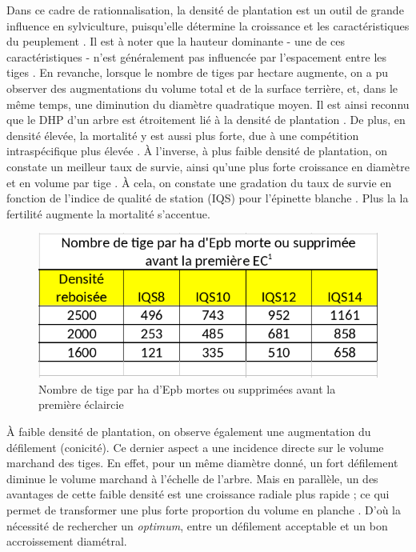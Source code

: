 \documentclass[letterpaper, 12pt]{article}
\begin{document}
\begin{onehalfspace}
Dans ce cadre de rationnalisation, la densité de plantation est un outil de grande influence en sylviculture, puisqu'elle détermine la croissance et les caractéristiques du peuplement \cite{Thiffault2003}. Il est à noter que la hauteur dominante - une de ces caractéristiques - n'est généralement pas influencée par l'espacement entre les tiges \cite{Gizachew2012}. En revanche, lorsque le nombre de tiges par hectare augmente, on a pu observer des augmentations du volume total et de la surface terrière, et, dans le même temps, une diminution du diamètre quadratique moyen. Il est ainsi reconnu que le DHP d'un arbre est étroitement lié à la densité de plantation \cite{Pregent1998}. De plus, en densité élevée, la mortalité y est aussi plus forte, due à une compétition intraspécifique plus élevée \cite{Groot2016, Will2010}. À l'inverse, à plus faible densité de plantation, on constate un meilleur taux de survie, ainsi qu'une plus forte croissance en diamètre et en volume par tige \cite{Akers2013}. À cela, on constate une gradation du taux de survie en fonction de l'indice de qualité de station (IQS)  pour l'épinette blanche \cite{Pregent2010}. Plus la la fertilité augmente la mortalité s'accentue.

\vspace{12pt}

\begin{figure}[h]
	\centering
	\includegraphics[width=12cm]{IQS}
	\caption{Nombre de tige par ha d'Epb mortes ou supprimées avant la première éclaircie \cite{Pregent2010}}
	\label{iqs}
\end{figure}

\vspace{12pt}

À faible densité de plantation, on observe également une augmentation du défilement (conicité). Ce dernier aspect a une incidence directe sur le volume marchand des tiges. En effet, pour un même diamètre donné, un fort défilement diminue le volume marchand à l'échelle de l'arbre\cite{Pregent1998}. Mais en parallèle, un des avantages de cette faible densité est une croissance radiale plus rapide ; ce qui permet de transformer une plus forte proportion du volume en planche \cite{Auty2014}. D'où la nécessité de rechercher un \textit{optimum}, entre un défilement acceptable et un bon accroissement diamétral.


\end{onehalfspace}
\end{document}
